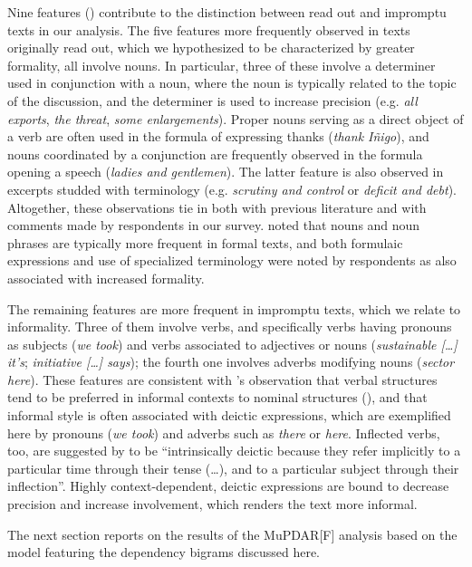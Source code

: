 \documentclass[output=paper]{langscibook}
\begin{document}
Nine features () contribute to the distinction between read out and impromptu texts in our analysis. The five features more frequently observed in texts originally read out, which we hypothesized to be characterized by greater formality, all involve nouns. In particular, three of these involve a determiner used in conjunction with a noun, where the noun is typically related to the topic of the discussion, and the determiner is used to increase precision (e.g. \textit{all exports}, \textit{the threat}, \textit{some enlargements}). Proper nouns serving as a direct object of a verb are often used in the formula of expressing thanks (\textit{thank Iñigo}), and nouns coordinated by a conjunction are frequently observed in the formula opening a speech (\textit{ladies and gentlemen}). The latter feature is also observed in excerpts studded with terminology (e.g. \textit{scrutiny and control} or \textit{deficit and debt}). Altogether, these observations tie in both with previous literature and with comments made by respondents in our survey. \citet{HeylighenDewaele1999} noted that nouns and noun phrases are typically more frequent in formal texts, and both formulaic expressions and use of specialized terminology were noted by respondents as also associated with increased formality.

The remaining features are more frequent in impromptu texts, which we relate to informality. Three of them involve verbs, and specifically verbs having pronouns as subjects (\textit{we took}) and verbs associated to adjectives or nouns (\textit{sustainable [\ldots] it’s}; \textit{initiative [\ldots] says}); the fourth one involves adverbs modifying nouns (\textit{sector here}). These features are consistent with \citeauthor{HeylighenDewaele1999}’s observation that verbal structures tend to be preferred in informal contexts to nominal structures (\citeyear{HeylighenDewaele1999}), and that informal style is often associated with deictic expressions, which are exemplified here by pronouns (\textit{we took}) and adverbs such as \textit{there} or \textit{here}. Inflected verbs, too, are suggested by \citet{HeylighenDewaele1999}  to  be “intrinsically deictic because they refer implicitly to a particular time through their tense (\ldots), and to a particular subject through their inflection”. Highly context-dependent, deictic expressions are bound to decrease precision and increase involvement, which renders the text more informal.

The next section reports on the results of the MuPDAR[F] analysis based on the model featuring the dependency bigrams discussed here.
\end{document}
